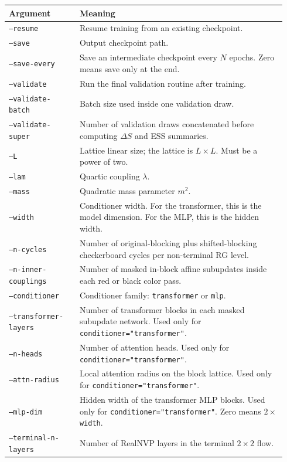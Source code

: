 \documentclass[11pt]{article}
\begin{document}
\begin{longtable}{p{0.24\linewidth}p{0.70\linewidth}}
\toprule
Argument & Meaning \\
\midrule
\endhead
\texttt{--resume} & Resume training from an existing checkpoint. \\
\texttt{--save} & Output checkpoint path. \\
\texttt{--save-every} & Save an intermediate checkpoint every $N$ epochs. Zero means save only at the end. \\
\texttt{--validate} & Run the final validation routine after training. \\
\texttt{--validate-batch} & Batch size used inside one validation draw. \\
\texttt{--validate-super} & Number of validation draws concatenated before computing $\Delta S$ and ESS summaries. \\
\texttt{--L} & Lattice linear size; the lattice is $L\times L$. Must be a power of two. \\
\texttt{--lam} & Quartic coupling $\lambda$. \\
\texttt{--mass} & Quadratic mass parameter $m^2$. \\
\texttt{--width} & Conditioner width. For the transformer, this is the model dimension. For the MLP, this is the hidden width. \\
\texttt{--n-cycles} & Number of original-blocking plus shifted-blocking checkerboard cycles per non-terminal RG level. \\
\texttt{--n-inner-couplings} & Number of masked in-block affine subupdates inside each red or black color pass. \\
\texttt{--conditioner} & Conditioner family: \texttt{transformer} or \texttt{mlp}. \\
\texttt{--transformer-layers} & Number of transformer blocks in each masked subupdate network. Used only for \texttt{conditioner="transformer"}. \\
\texttt{--n-heads} & Number of attention heads. Used only for \texttt{conditioner="transformer"}. \\
\texttt{--attn-radius} & Local attention radius on the block lattice. Used only for \texttt{conditioner="transformer"}. \\
\texttt{--mlp-dim} & Hidden width of the transformer MLP blocks. Used only for \texttt{conditioner="transformer"}. Zero means $2\times$\texttt{width}. \\
\texttt{--terminal-n-layers} & Number of RealNVP layers in the terminal $2\times 2$ flow. \\

\end{longtable}
\end{document}
